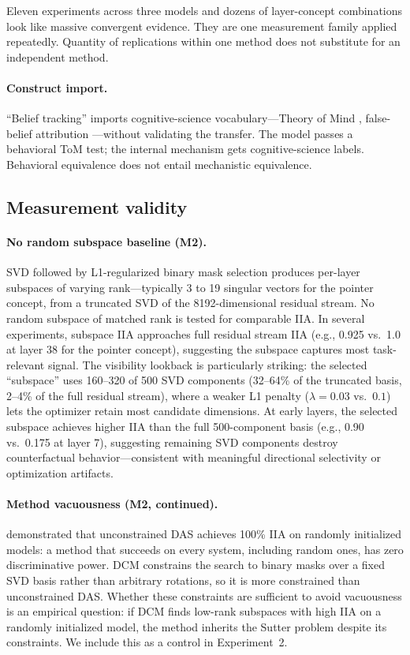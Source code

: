 \documentclass{article}
\begin{document}
Eleven experiments across three models and dozens of layer-concept combinations look like massive convergent evidence. They are one measurement family applied repeatedly. Quantity of replications within one method does not substitute for an independent method.

\paragraph{Construct import.}
``Belief tracking'' imports cognitive-science vocabulary---Theory of Mind \citep{premack1978chimpanzee}, false-belief attribution \citep{wimmer1983beliefs}---without validating the transfer. The model passes a behavioral ToM test; the internal mechanism gets cognitive-science labels. Behavioral equivalence does not entail mechanistic equivalence.

\subsection{Measurement validity}

\paragraph{No random subspace baseline (M2).}
SVD followed by L1-regularized binary mask selection produces per-layer subspaces of varying rank---typically 3 to 19 singular vectors for the pointer concept, from a truncated SVD of the 8192-dimensional residual stream. No random subspace of matched rank is tested for comparable IIA. In several experiments, subspace IIA approaches full residual stream IIA (e.g., 0.925 vs.\ 1.0 at layer 38 for the pointer concept), suggesting the subspace captures most task-relevant signal. The visibility lookback is particularly striking: the selected ``subspace'' uses 160--320 of 500 SVD components (32--64\% of the truncated basis, 2--4\% of the full residual stream), where a weaker L1 penalty ($\lambda = 0.03$ vs.\ $0.1$) lets the optimizer retain most candidate dimensions. At early layers, the selected subspace achieves higher IIA than the full 500-component basis (e.g., 0.90 vs.\ 0.175 at layer 7), suggesting remaining SVD components destroy counterfactual behavior---consistent with meaningful directional selectivity or optimization artifacts.

\paragraph{Method vacuousness (M2, continued).}
\citet{sutter2025vacuous} demonstrated that unconstrained DAS achieves 100\% IIA on randomly initialized models: a method that succeeds on every system, including random ones, has zero discriminative power. DCM constrains the search to binary masks over a fixed SVD basis rather than arbitrary rotations, so it is more constrained than unconstrained DAS. Whether these constraints are sufficient to avoid vacuousness is an empirical question: if DCM finds low-rank subspaces with high IIA on a randomly initialized model, the method inherits the Sutter problem despite its constraints. We include this as a control in Experiment~2.
\end{document}
